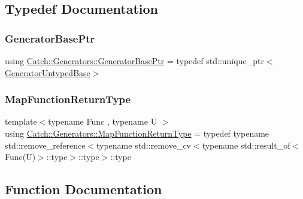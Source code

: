 \subsection{Typedef Documentation}
\mbox{\label{namespace_catch_1_1_generators_a1519f304113619d7d18670e2f08276c0}} 
\subsubsection{\texorpdfstring{GeneratorBasePtr}{GeneratorBasePtr}}
{\footnotesize\ttfamily using \mbox{\hyperlink{namespace_catch_1_1_generators_a1519f304113619d7d18670e2f08276c0}{Catch\+::\+Generators\+::\+Generator\+Base\+Ptr}} = typedef std\+::unique\+\_\+ptr$<$\mbox{\hyperlink{class_catch_1_1_generators_1_1_generator_untyped_base}{Generator\+Untyped\+Base}}$>$}

\mbox{\label{namespace_catch_1_1_generators_aa509b9b4dd25a6d6309ce8c7da441c02}} 
\subsubsection{\texorpdfstring{MapFunctionReturnType}{MapFunctionReturnType}}
{\footnotesize\ttfamily template$<$typename Func , typename U $>$ \\
using \mbox{\hyperlink{namespace_catch_1_1_generators_aa509b9b4dd25a6d6309ce8c7da441c02}{Catch\+::\+Generators\+::\+Map\+Function\+Return\+Type}} = typedef typename std\+::remove\+\_\+reference$<$typename std\+::remove\+\_\+cv$<$typename std\+::result\+\_\+of$<$Func(U)$>$\+::type$>$\+::type$>$\+::type}



\subsection{Function Documentation}
\mbox{\label{namespace_catch_1_1_generators_a36413e3baec520d89d21bea23b7bea5b}} 
